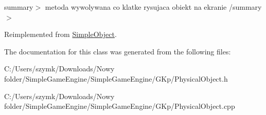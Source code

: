 summary$>$ metoda wywolywana co klatke rysujaca obiekt na ekranie /summary$>$ 

Reimplemented from \hyperlink{class_simple_object_a38a3ceafd11a673fd68dd87ed6ebd35b}{Simple\+Object}.



The documentation for this class was generated from the following files\+:\begin{DoxyCompactItemize}
\item 
C\+:/\+Users/szymk/\+Downloads/\+Nowy folder/\+Simple\+Game\+Engine/\+Simple\+Game\+Engine/\+G\+Kp/Physical\+Object.\+h\item 
C\+:/\+Users/szymk/\+Downloads/\+Nowy folder/\+Simple\+Game\+Engine/\+Simple\+Game\+Engine/\+G\+Kp/Physical\+Object.\+cpp\end{DoxyCompactItemize}
